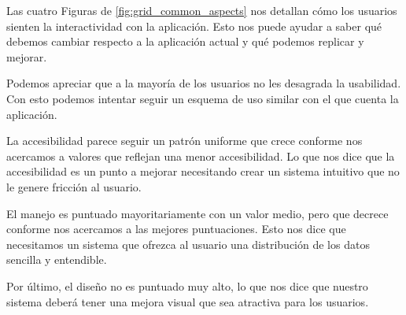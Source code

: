 Las cuatro Figuras de \ref{fig:grid_common_aspects} nos detallan cómo los usuarios sienten la interactividad con la aplicación. Esto nos puede ayudar a saber qué debemos cambiar respecto a la aplicación actual y qué podemos replicar y mejorar.

Podemos apreciar que a la mayoría de los usuarios no les desagrada la usabilidad. Con esto podemos intentar seguir un esquema de uso similar con el que cuenta la aplicación.

La accesibilidad parece seguir un patrón uniforme que crece conforme nos acercamos a valores que reflejan una menor accesibilidad. Lo que nos dice que la accesibilidad es un punto a mejorar necesitando crear un sistema intuitivo que no le genere fricción al usuario. 

El manejo es puntuado mayoritariamente con un valor medio, pero que decrece conforme nos acercamos a las mejores puntuaciones. Esto nos dice que necesitamos un sistema que ofrezca al usuario una distribución de los datos sencilla y entendible. 

Por último, el diseño no es puntuado muy alto, lo que nos dice que nuestro sistema deberá tener una mejora visual que sea atractiva para los usuarios.